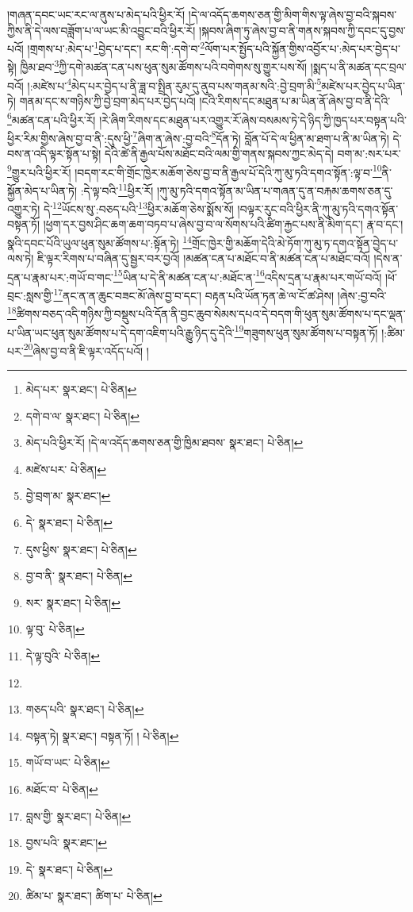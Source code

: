 །གཞན་དབང་ཡང་རང་ལ་ནུས་པ་མེད་པའི་ཕྱིར་རོ། །དེ་ལ་འདོད་ཆགས་ཅན་གྱི་མིག་གིས་ལྟ་ཞེས་བྱ་བའི་སྐབས་ཀྱིས་ནི་དེ་ལས་བཟློག་པ་ལ་ཡང་མི་འབྱུང་བའི་ཕྱིར་རོ། །སྐབས་ཞིག་ཏུ་ཞེས་བྱ་བ་ནི་གནས་སྐབས་ཀྱི་དབང་དུ་བྱས་པའོ། །གྲགས་པ་:མེད་པ་\footnote{མེད་པར་  སྣར་ཐང་།  པེ་ཅིན། }བྱེད་པ་དང་། རང་གི་:དགེ་བ་\footnote{དགེ་བ་ལ་  སྣར་ཐང་།  པེ་ཅིན། }ལོག་པར་སྤྱོད་པའི་སྐྱོན་གྱིས་འབྱོར་པ་:མེད་པར་བྱེད་པ་སྟེ། ཁྱིམ་ཐབ་\footnote{མེད་པའི་ཕྱིར་རོ། །དེ་ལ་འདོད་ཆགས་ཅན་གྱི་ཁྱིམ་ཐབས་  སྣར་ཐང་།  པེ་ཅིན། }ཀྱི་དགེ་མཚན་ངན་པས་ཕུན་སུམ་ཚོགས་པའི་བགེགས་སུ་གྱུར་པས་སོ། །སྨད་པ་ནི་མཚན་དང་བྲལ་བའོ། །:མཛེས་པ་\footnote{མཛེས་པར་  པེ་ཅིན། }མེད་པར་བྱེད་པ་ནི་ཟླ་བ་སྤྲིན་རུམ་དུ་ནུབ་པས་གནམ་སའི་:བྱེ་བྲག་མི་\footnote{བྱེ་བྲག་མ་  སྣར་ཐང་། }མཛེས་པར་བྱེད་པ་ཡིན་ཏེ། གནམ་དང་ས་གཉིས་ཀྱི་བྱེ་བྲག་མེད་པར་བྱེད་པའོ། །ངའི་རིགས་དང་མཐུན་པ་མ་ཡིན་ནོ་ཞེས་བྱ་བ་ནི་དེའི་\footnote{དེ་  སྣར་ཐང་།  པེ་ཅིན། }མཚན་ངན་པའི་ཕྱིར་རོ། །རེ་ཞིག་རིགས་དང་མཐུན་པར་འགྱུར་རོ་ཞེས་བསམས་ཏེ་དེ་ཉིད་ཀྱི་ཁྱད་པར་བསྟན་པའི་ཕྱིར་རིམ་གྱིས་ཞེས་བྱ་བ་ནི་:དུས་ཕྱི་\footnote{དུས་ཕྱིས་  སྣར་ཐང་།  པེ་ཅིན། }ཞིག་ན་ཞེས་:བྱ་བའི་\footnote{བྱ་བ་ནི་  སྣར་ཐང་།  པེ་ཅིན། }དོན་ཏེ། བློན་པོ་དེ་ལ་ཕྱིན་མ་ཐག་པ་ནི་མ་ཡིན་ཏེ། དེ་བས་ན་འདི་ལྟར་སྟོན་པ་སྟེ། དེའི་ཚེ་ནི་རྒྱལ་པོས་མཐོང་བའི་ལམ་གྱི་གནས་སྐབས་ཀྱང་མེད་དེ། བག་མ་:སར་པར་\footnote{སར་  སྣར་ཐང་།  པེ་ཅིན། }གྱུར་པའི་ཕྱིར་རོ། །བདག་རང་གི་གྲོང་ཁྱེར་མཆོག་ཅེས་བྱ་བ་ནི་རྒྱལ་པོ་དེའི་ཀུ་མུ་ཏའི་དགའ་སྟོན་:ལྟ་བ་\footnote{ལྟ་བུ་  པེ་ཅིན། }ནི་སྐྱོན་མེད་པ་ཡིན་ཏེ། :དེ་ལྟ་བའི་\footnote{དེ་ལྟ་བུའི་  པེ་ཅིན། }ཕྱིར་རོ། །ཀུ་མུ་ཏའི་དགའ་སྟོན་མ་ཡིན་པ་གཞན་དུ་ན་བརྐམ་ཆགས་ཅན་དུ་འགྱུར་ཏེ། དེ་\footnote{}ཡོངས་སུ་:བཅད་པའི་\footnote{གཅད་པའི་  སྣར་ཐང་།  པེ་ཅིན། }ཕྱིར་མཆོག་ཅེས་སྨོས་སོ། །བལྟར་རུང་བའི་ཕྱིར་ནི་ཀུ་མུ་ཏའི་དགའ་སྟོན་བསྟན་ཏོ། །ཕྱག་དར་བྱས་ཤིང་ཆག་ཆག་བཏབ་པ་ཞེས་བྱ་བ་ལ་སོགས་པའི་ཚིག་རྐྱང་པས་ནི་མིག་དང་། རྣ་བ་དང་། སྣའི་དབང་པོའི་ཡུལ་ཕུན་སུམ་ཚོགས་པ་:སྟོན་ཏེ། \footnote{བསྟན་ཏེ།   སྣར་ཐང་། བསྟན་ཏོ། །   པེ་ཅིན། }གྲོང་ཁྱེར་གྱི་མཆོག་དེའི་མེ་ཏོག་ཀུ་མུ་ཏ་དགའ་སྟོན་བྱེད་པ་ལས་ཏེ། ཇི་ལྟར་རིགས་པ་བཞིན་དུ་སྦྱར་བར་བྱའོ། །མཚན་ངན་པ་མཐོང་བ་ནི་མཚན་ངན་པ་མཐོང་བའོ། །དེས་ན་དྲན་པ་རྣམ་པར་:གཡོ་བ་གང་\footnote{གཡོ་བ་ཡང་  པེ་ཅིན། }ཡིན་པ་དེ་ནི་མཚན་ངན་པ་:མཐོང་ན་\footnote{མཐོང་བ་  པེ་ཅིན། }འདིས་དྲན་པ་རྣམ་པར་གཡོ་བའོ། །ཕོ་བྲང་:སླས་གྱི་\footnote{བླས་གྱི་  སྣར་ཐང་།  པེ་ཅིན། }ནང་ན་ན་ཆུང་བཟང་མོ་ཞེས་བྱ་བ་དང་། བརྟན་པའི་ཡོན་ཏན་ཆེ་ལ་ངོ་ཚ་ཤེས། །ཞེས་:བྱ་བའི་\footnote{བྱས་པའི་  སྣར་ཐང་། }ཚིགས་བཅད་འདི་གཉིས་ཀྱི་བསྡུས་པའི་དོན་ནི་བྱང་ཆུབ་སེམས་དཔའ་དེ་བདག་གི་ཕུན་སུམ་ཚོགས་པ་དང་ལྡན་པ་ཡིན་ཡང་ཕུན་སུམ་ཚོགས་པ་དེ་དག་འཇིག་པའི་རྒྱུ་ཉིད་དུ་དེའི་\footnote{དེ་  སྣར་ཐང་།  པེ་ཅིན། }གཟུགས་ཕུན་སུམ་ཚོགས་པ་བསྟན་ཏོ། །:ཚིམ་པར་\footnote{ཚིམ་པ་  སྣར་ཐང་། ཚིག་པ་  པེ་ཅིན། }ཞེས་བྱ་བ་ནི་ཇི་ལྟར་འདོད་པའོ། །
